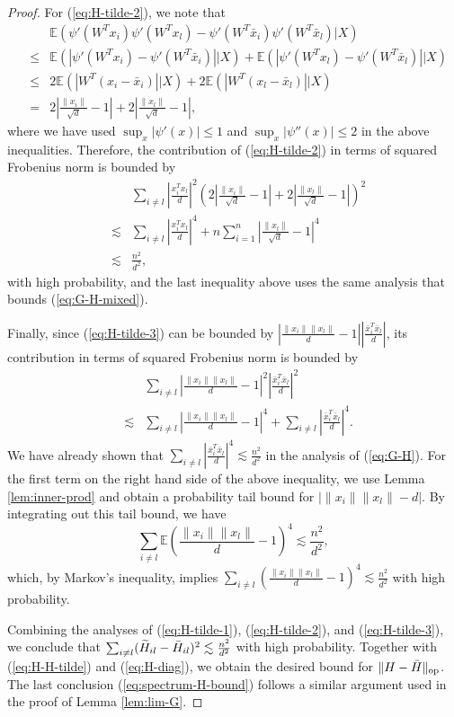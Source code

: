 \begin{proof}
For (\ref{eq:H-tilde-2}), we note that
\begin{eqnarray*}
&& \mathbb{E}\left(\psi'(W^T{x}_i)\psi'(W^T{x}_l)-\psi'(W^T\bar{x}_i)\psi'(W^T\bar{x}_l)\big|X\right) \\
&\leq& \mathbb{E}\left(|\psi'(W^T{x}_i)-\psi'(W^T\bar{x}_i)|\big|X\right) + \mathbb{E}\left(|\psi'(W^T{x}_l)-\psi'(W^T\bar{x}_l)|\big|X\right) \\
&\leq& 2\mathbb{E}\left(|W^T(x_i-\bar{x}_i)|\big|X\right) + 2\mathbb{E}\left(|W^T(x_l-\bar{x}_l)|\big|X\right) \\
&=& 2\left|\frac{\|x_i\|}{\sqrt{d}}-1\right| + 2\left|\frac{\|x_l\|}{\sqrt{d}}-1\right|,
\end{eqnarray*}
where we have used $\sup_x|\psi'(x)|\leq 1$ and $\sup_x|\psi''(x)|\leq 2$ in the above inequalities. Therefore, the contribution of (\ref{eq:H-tilde-2}) in terms of squared Frobenius norm is bounded by
\begin{eqnarray*}
&& \sum_{i\neq l}\left|\frac{x_i^Tx_l}{d}\right|^2\left(2\left|\frac{\|x_i\|}{\sqrt{d}}-1\right| + 2\left|\frac{\|x_l\|}{\sqrt{d}}-1\right|\right)^2 \\
&\lesssim& \sum_{i\neq l}\left|\frac{x_i^Tx_l}{d}\right|^4 + n\sum_{i=1}^n\left|\frac{\|x_l\|}{\sqrt{d}}-1\right|^4 \\
&\lesssim& \frac{n^2}{d^2},
\end{eqnarray*}
with high probability, and the last inequality above uses the same analysis that bounds (\ref{eq:G-H-mixed}).

Finally, since (\ref{eq:H-tilde-3}) can be bounded by $\left|\frac{\|x_i\|\|x_l\|}{d}-1\right|\left|\frac{\bar{x}_i^T\bar{x}_l}{d}\right|$, its contribution in terms of squared Frobenius norm is bounded by
\begin{eqnarray*}
&& \sum_{i\neq l}\left|\frac{\|x_i\|\|x_l\|}{d}-1\right|^2\left|\frac{\bar{x}_i^T\bar{x}_l}{d}\right|^2 \\
&\lesssim& \sum_{i\neq l}\left|\frac{\|x_i\|\|x_l\|}{d}-1\right|^4 + \sum_{i\neq l}\left|\frac{\bar{x}_i^T\bar{x}_l}{d}\right|^4.
\end{eqnarray*}
We have already shown that $\sum_{i\neq l}\left|\frac{\bar{x}_i^T\bar{x}_l}{d}\right|^4\lesssim \frac{n^2}{d^2}$ in the analysis of (\ref{eq:G-H}). For the first term on the right hand side of the above inequality, we use Lemma \ref{lem:inner-prod} and obtain a probability tail bound for $|\|x_i\|\|x_l\|-d|$. By integrating out this tail bound, we have
$$\sum_{i\neq l}\mathbb{E}\left(\frac{\|x_i\|\|x_l\|}{d}-1\right)^4\lesssim \frac{n^2}{d^2},$$
which, by Markov's inequality, implies $\sum_{i\neq l}\left(\frac{\|x_i\|\|x_l\|}{d}-1\right)^4\lesssim \frac{n^2}{d^2}$ with high probability.

Combining the analyses of (\ref{eq:H-tilde-1}), (\ref{eq:H-tilde-2}), and (\ref{eq:H-tilde-3}), we conclude that $\sum_{i\neq l}(\widetilde{H}_{il}-\bar{H}_{il})^2\lesssim \frac{n^2}{d^2}$ with high probability. Together with (\ref{eq:H-H-tilde}) and (\ref{eq:H-diag}), we obtain the desired bound for $\|H-\bar{H}\|_{\rm op}$.
The last conclusion (\ref{eq:spectrum-H-bound}) follows a similar argument used in the proof of Lemma \ref{lem:lim-G}.
\end{proof}

